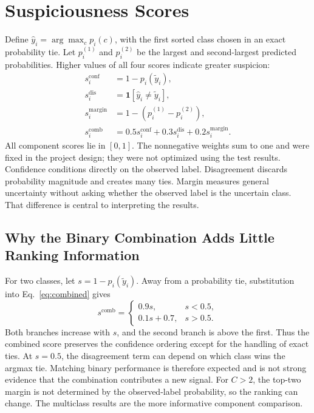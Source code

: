 \section{Suspiciousness Scores}
Define $\widehat y_i=\arg\max_c p_i(c)$, with the first sorted class chosen in
an exact probability tie. Let $p_i^{(1)}$ and $p_i^{(2)}$ be the largest and
second-largest predicted probabilities. Higher values of all four scores
indicate greater suspicion:
\begin{align}
 s_i^{\mathrm{conf}} &= 1-p_i(\widetilde y_i),\\
 s_i^{\mathrm{dis}} &= \mathbf{1}[\widehat y_i\ne\widetilde y_i],\\
 s_i^{\mathrm{margin}} &= 1-(p_i^{(1)}-p_i^{(2)}),\\
 s_i^{\mathrm{comb}} &= 0.5s_i^{\mathrm{conf}}+0.3s_i^{\mathrm{dis}}+0.2s_i^{\mathrm{margin}}.
 \label{eq:combined}
\end{align}
All component scores lie in $[0,1]$. The nonnegative weights sum to one and
were fixed in the project design; they were not optimized using the test
results. Confidence conditions directly on the observed label. Disagreement
discards probability magnitude and creates many ties. Margin measures general
uncertainty without asking whether the observed label is the uncertain class.
That difference is central to interpreting the results.

\subsection{Why the Binary Combination Adds Little Ranking Information}
For two classes, let $s=1-p_i(\widetilde y_i)$. Away from a probability tie,
substitution into Eq.~\eqref{eq:combined} gives
\begin{equation}
 s^{\mathrm{comb}}=
 \begin{cases}
  0.9s,&s<0.5,\\
  0.1s+0.7,&s>0.5.
 \end{cases}
 \label{eq:binary}
\end{equation}
Both branches increase with $s$, and the second branch is above the first.
Thus the combined score preserves the confidence ordering except for the
handling of exact ties. At $s=0.5$, the disagreement term can depend on which
class wins the argmax tie. Matching binary performance is therefore expected
and is not strong evidence that the combination contributes a new signal.
For $C>2$, the top-two margin is not determined by the observed-label
probability, so the ranking can change. The multiclass results are the more
informative component comparison.

